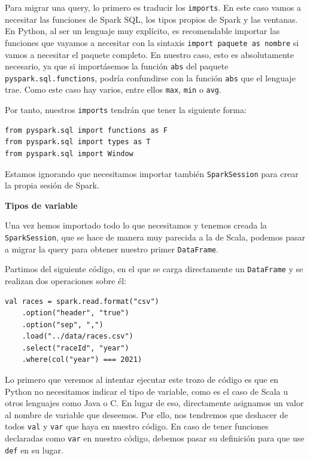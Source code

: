 \documentclass[12pt,twoside,titlepage]{report}
\begin{document}
Para migrar una query, lo primero es traducir los \texttt{imports}. En este caso vamos a necesitar las funciones de Spark SQL, los tipos propios de Spark y las ventanas. En Python, al ser un lenguaje muy explícito, es recomendable importar las funciones que vayamos a necesitar con la sintaxis \texttt{import {paquete} as {nombre}} si vamos a necesitar el paquete completo. En nuestro caso, esto es absolutamente necesario, ya que si importásemos la función \texttt{abs} del paquete \texttt{pyspark.sql.functions}, podría confundirse con la función \texttt{abs} que el lenguaje trae. Como este caso hay varios, entre ellos \texttt{max}, \texttt{min} o \texttt{avg}.

Por tanto, nuestros \texttt{imports} tendrán que tener la siguiente forma:

\begin{lstlisting}
from pyspark.sql import functions as F
from pyspark.sql import types as T
from pyspark.sql import Window
\end{lstlisting}

Estamos ignorando que necesitamos importar también \texttt{SparkSession} para crear la propia sesión de Spark.

\textbf{Tipos de variable}

Una vez hemos importado todo lo que necesitamos y tenemos creada la \texttt{SparkSession}, que se hace de manera muy parecida a la de Scala, podemos pasar a migrar la query para obtener nuestro primer \texttt{DataFrame}.

Partimos del siguiente código, en el que se carga directamente un \texttt{DataFrame} y se realizan dos operaciones sobre él:

\begin{lstlisting}
val races = spark.read.format("csv")
	.option("header", "true")
	.option("sep", ",")
	.load("../data/races.csv")
	.select("raceId", "year")
	.where(col("year") === 2021)
\end{lstlisting}

Lo primero que veremos al intentar ejecutar este trozo de código es que en Python no necesitamos indicar el tipo
de variable, como es el caso de Scala u otros lenguajes como Java o C. En lugar de eso, directamente asignamos un valor al nombre de variable que deseemos. Por ello, nos tendremos que deshacer de todos \texttt{val} y \texttt{var} que haya en nuestro código. En caso de tener funciones declaradas como \texttt{var} en nuestro código, debemos pasar su definición para que use \texttt{def} en su lugar.
\end{document}
